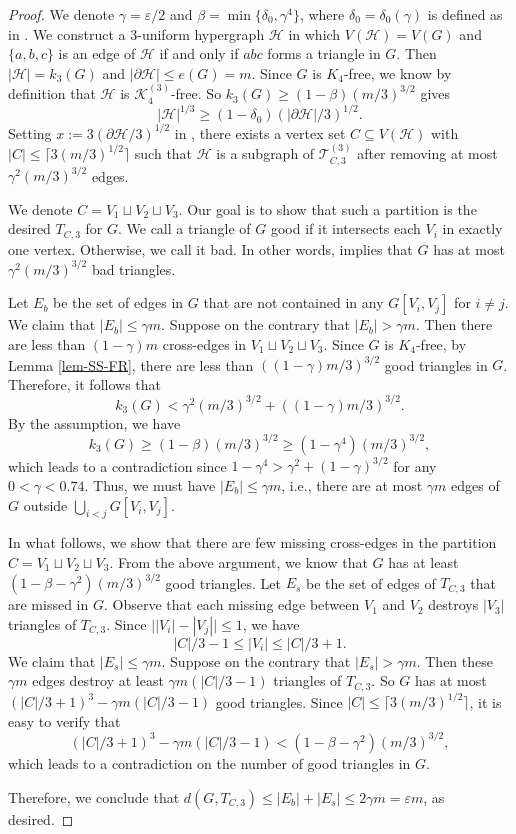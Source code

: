 \documentclass[11pt,a4paper]{article}
\theoremstyle{definition}
\theoremstyle{remark}
\begin{document}
\begin{proof}
We denote $\gamma = \varepsilon /2$ and 
$\beta = \min\{\delta_0, \gamma^4\}$, where $\delta_0=\delta_0(\gamma)$ is defined as in . 
    We construct a $3$-uniform hypergraph $\mathcal{H}$ in which $V(\mathcal{H})=V(G)$ and 
    $\{a,b,c\}$ is an edge of $\mathcal{H}$ if and only if $abc$ forms a triangle in $G$. 
    Then $|\mathcal{H}|=k_3(G)$ and $|\partial \mathcal{H}| \le e(G)=m$. 
    Since $G$ is $K_4$-free, we know by definition that $\mathcal{H}$ is $\mathcal{K}_4^{(3)}$-free. So $k_3(G)\ge (1- \beta )(m/3)^{3/2}$ gives 
    \[  |\mathcal{H}|^{1/3} \ge (1- \delta_0) 
    \left( {|\partial \mathcal{H}|}/{3}\right)^{1/2}. \]
    Setting $x:=3(\partial \mathcal{H}/3)^{1/2}$ in , there exists 
     a vertex set $C\subseteq V(\mathcal{H})$ with 
    $|C|\le \lceil 3(m/3)^{1/2}\rceil$ such that 
    $\mathcal{H}$ is a subgraph of $\mathcal{T}_{C,3}^{(3)}$ after removing at most $\gamma^2 (m/3)^{3/2}$ edges. 

    
    We denote $C=V_1\sqcup V_2\sqcup V_3$. 
    Our goal is to show that such a partition is the desired $T_{C,3}$ for $G$. 
    We call a triangle of $G$ good if it intersects each $V_i$ in exactly one vertex. Otherwise, we call it bad. In other words,  implies that 
    $G$ has at most $\gamma^2(m/3)^{3/2}$ bad triangles. 
    
   Let $E_b$ be the set of edges in $G$ that are not contained in any $G[V_i,V_j]$ for $i\neq j$. We claim that $|E_b|\le \gamma m$. 
   Suppose on the contrary that $|E_b|> \gamma m$. Then 
    there are less than $(1-\gamma)m$ cross-edges in $V_1\sqcup V_2\sqcup V_3$. Since $G$ is $K_4$-free, by Lemma \ref{lem-SS-FR}, there are less than $((1-\gamma)m/3)^{3/2}$ good triangles in $G$. Therefore, it follows that 
    \[ k_3(G)<\gamma^2(m/3)^{3/2} + ((1-\gamma)m/3)^{3/2}. \]  
    By the assumption, we have 
    \[  k_3(G)\ge (1- \beta )(m/3)^{3/2} \ge (1- \gamma^4)(m/3)^{3/2}, \] 
     which leads to a contradiction since $1-\gamma^4 > \gamma^2 + (1-\gamma)^{3/2}$ for any $0<\gamma<0.74$. Thus, we must have $|E_b| \le \gamma m$, i.e.,  
    there are at most $\gamma m$ edges of $G$ outside $\bigcup_{i<j} G[V_i,V_j]$. 

   In what follows, we show that there are few missing cross-edges in the partition $C=V_1\sqcup V_2\sqcup V_3$. From the above argument, we know that $G$ has at least $(1- \beta -\gamma^2)(m/3)^{3/2}$ good triangles. 
    Let $E_s$ be the set of edges of $T_{C,3}$ that are missed in $G$.   
     Observe that each missing edge between $V_1$ and $V_2$ destroys $|V_3|$ triangles of $T_{C,3}$. 
    Since $\big| |V_i| - |V_j| \big|\le 1$, we have 
    \[ |C|/3 -1 \le |V_i|\le |C|/3 +1. \] 
    We claim that $|E_s|\le \gamma m$. 
    Suppose on the contrary that $|E_s|> \gamma m$. Then these $\gamma m$ edges destroy at least $\gamma m (|C|/3-1)$ triangles of $T_{C,3}$. So $G$ has at most $(|C|/3 +1)^3 - \gamma m (|C|/3-1)$ good triangles. Since $|C|\le \lceil 3(m/3)^{1/2}\rceil$, it is easy to verify that 
    \[ (|C|/3 +1)^3 - \gamma m (|C|/3-1) < (1- \beta - \gamma^2)(m/3)^{3/2}, 
    \] 
    which leads to a contradiction on the number of good triangles in $G$. 

    Therefore, we conclude that 
    $d(G,T_{C,3})\le |E_b| + |E_s| \le 
    2\gamma m = \varepsilon m$, as desired. 
\end{proof}
\end{document}
